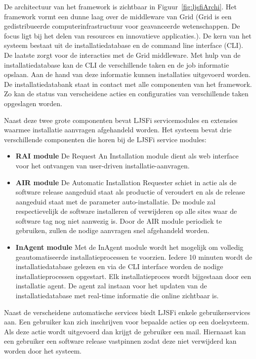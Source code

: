 De architectuur van het framework is zichtbaar in Figuur~\ref{fig:ljsfiArchi}.
Het framework vormt een dunne laag over de middleware van Grid (Grid is een gedistribueerde computerinfrastructuur voor geavanceerde wetenschappen. De focus ligt bij het delen van resources en innovatieve applicaties.\citep{foster2001anatomy}).
De kern van het systeem bestaat uit de installatiedatabase en de command line interface (CLI).
De laatste zorgt voor de interacties met de Grid middleware.
Met hulp van de installatiedatabase kan de CLI de verschillende taken en de job informatie opslaan.
Aan de hand van deze informatie kunnen installaties uitgevoerd worden.
De installatiedatabank staat in contact met alle componenten van het framework.
Zo kan de status van verscheidene acties en configuraties van verschillende taken opgeslagen worden.

Naast deze twee grote componenten bevat LJSFi servicemodules en extensies waarmee installatie aanvragen afgehandeld worden.
Het systeem bevat drie verschillende componenten die horen bij de LJSFi service modules:
\begin{itemize}
\item \textbf{RAI module} De Request An Installation module dient als web interface voor het ontvangen van user-driven installatie-aanvragen.
\item \textbf{AIR module} De Automatic Installation Requester schiet in actie als de software release aangeduid staat als productie of veroudert en als de release aangeduid staat met de parameter auto-installatie.
De module zal respectievelijk de software installeren of verwijderen op alle sites waar de software tag nog niet aanwezig is.
Door de AIR module periodiek te gebruiken, zullen de nodige aanvragen snel afgehandeld worden.
\item \textbf{InAgent module} Met de InAgent module wordt het mogelijk om volledig geautomatiseerde installatieprocessen te voorzien.
Iedere 10 minuten wordt de installatiedatabase gelezen en via de CLI interface worden de nodige installatieprocessen opgestart.
Elk installatieproces wordt bijgestaan door een installatie agent.
De agent zal instaan voor het updaten van de installatiedatabase met real-time informatie die online zichtbaar is.
\end{itemize}

Naast de verscheidene automatische services biedt LJSFi enkele gebruikerservices aan.
Een gebruiker kan zich inschrijven voor bepaalde acties op een doelsysteem.
Als deze actie wordt uitgevoerd dan krijgt de gebruiker een mail.
Hiernaast kan een gebruiker een software release vastpinnen zodat deze niet verwijderd kan worden door het systeem.

